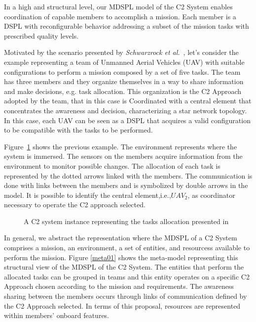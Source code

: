 In a high and structural level, our MDSPL model of the C2 System enables coordination of capable members to accomplish a mission. Each member is a DSPL with reconfigurable behavior addressing a subset of the mission tasks with prescribed quality levels. 

Motivated by the scenario presented by \textit{Schwarzrock et al.}~\cite{Schwarzrock2017}, let's consider the example representing a team of Unmanned Aerial Vehicles (UAV) with suitable configurations to perform a mission composed by a set of five tasks. The team has three members and they organize themselves in a way to share information and make decisions, e.g. task allocation. This organization is the C2 Approach adopted by the team, that in this case is Coordinated with a central element that concentrates the awareness and decision, characterizing a star network topology. In this case, each UAV can be seen as a DSPL that acquires a valid configuration to be compatible with the tasks to be performed.

Figure~\ref{example1} shows the previous example. The environment represents where the system is immersed. The sensors on the members acquire information from the environment to monitor possible changes. The allocation of each task is represented by the dotted arrows linked with the members. The communication is done with links between the members and is symbolized by double arrows in the model. It is possible to identify the central element,i.e.,$UAV_2$, as coordinator necessary to operate the C2 approach selected. 

\begin{figure}[h]
\centering
\scalebox{.8}{}
\label{example1}
\caption{A C2 system instance representing the tasks allocation presented in \cite{Schwarzrock2017}}
\end{figure}

In general, we abstract the representation where the MDSPL of a C2 System comprises a mission, an environment, a set of entities, and resourcess available to perform the mission. Figure \ref{meta01} shows the meta-model representing this structural view of the MDSPL of the C2 System.  The entities that perform the allocated tasks can be grouped in teams and this entity operates on a specific C2 Approach chosen according to the mission and requirements. The awareness sharing between the members occurs through links of communication defined by the C2 Approach selected. In terms of this proposal, resources are represented within members' onboard features.

